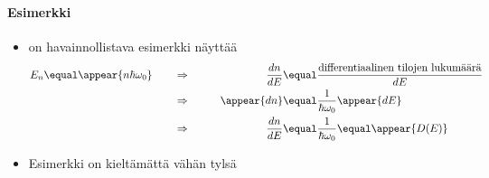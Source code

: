 \begin{frame}
\frametitle{\texorpdfstring{\culine[\sectiontitleulinecolor]{\sectiontitle}}{\sectiontitle} }
\framesubtitle{Esimerkki}

\appear{}
\begin{itemize}
\item {} on havainnollistava esimerkki näyttää  
\[
\begin{aligned}
E_{n}  \equal \appear{n \hbar \omega_{0}} \qquad &\Rightarrow& \qquad
\frac{d n}{d E} &\equal \frac{\text{differentiaalinen tilojen lukumäärä}}{d E} \\
&\Rightarrow& \qquad \appear{d n} &  \equal \frac{1}{\hbar \omega_{0}} \appear{d E} \\
&\Rightarrow &    \frac{d n}{d E} & \equal \frac{1}{\hbar \omega_{0}}  \equal \appear{D(E)}
 \end{aligned}
\]

\item Esimerkki on kieltämättä vähän tylsä 
\end{itemize}


\endofslide 
\end{frame}

